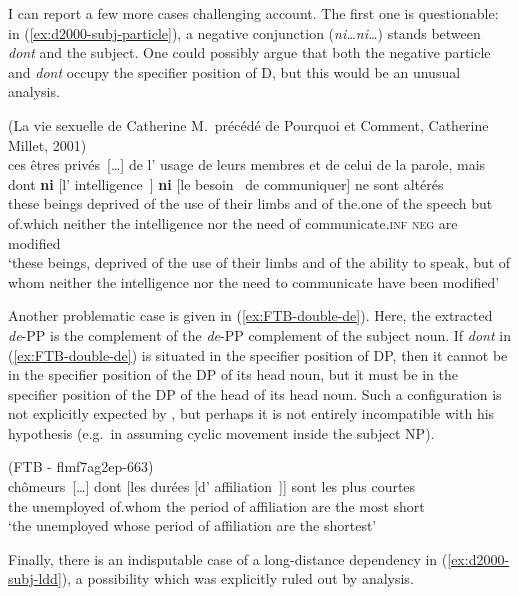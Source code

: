 I can report a few more cases challenging  account. The first one is questionable: in (\ref{ex:d2000-subj-particle}), a negative conjunction (\emph{ni\dots ni\dots}) stands between \emph{dont} and the subject. One could possibly argue that both the negative particle and \emph{dont} occupy the specifier position of D, but this would be an unusual analysis.

\ea (La vie sexuelle de Catherine M.\ précédé de Pourquoi et Comment, Catherine Millet, 2001)\nopagebreak\\
\gll ces êtres privés~[\dots] de l' usage de leurs membres et de celui de la parole, mais	dont	\textbf{ni} [l' intelligence~\trace{}] \textbf{ni} [le besoin~\trace{} de communiquer] ne sont altérés\\
these beings deprived of the use of their limbs and of the.one of the speech but of.which neither the intelligence nor the need of communicate\textsc{.inf} \textsc{neg} are modified\\
\glt `these beings, deprived of the use of their limbs and of the ability to speak, but of whom neither the intelligence nor the need to communicate have been modified'
\label{ex:d2000-subj-particle}
\z\largerpage[2]

Another problematic case is given in (\ref{ex:FTB-double-de}). Here, the extracted \emph{de}-PP is the complement of the \emph{de}-PP complement of the subject noun. If \emph{dont}  in (\ref{ex:FTB-double-de}) is situated in the specifier position of DP, then it cannot be in the specifier position of the DP of its head noun, but it must be in the specifier position of the DP of the head of its head noun. Such a configuration is not explicitly expected by \citet{Heck.2009}, but perhaps it is not entirely incompatible with his hypothesis (e.g.\ in assuming cyclic movement inside the subject NP). 

\ea (FTB - flmf7ag2ep-663)\\
\gll [les] chômeurs~[\dots] dont [les durées [d' affiliation~\trace{}]] sont les plus courtes\\
the unemployed of.whom the period of affiliation are the most short\\
\glt `the unemployed whose period of affiliation are the shortest'
\label{ex:FTB-double-de}
\z 

Finally, there is an indisputable case of a long-distance dependency in (\ref{ex:d2000-subj-ldd}), a possibility which was explicitly ruled out by  analysis.

